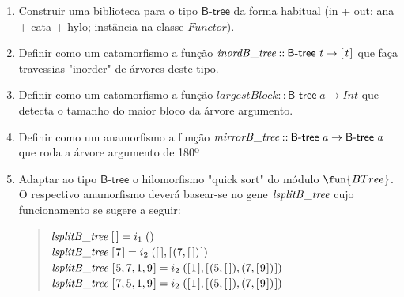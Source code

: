 \documentclass[a4paper]{article}
\newcommand{\Conid}[1]{\mathit{#1}}
\newcommand{\Varid}[1]{\mathit{#1}}
\begin{document}
\begin{enumerate}
\item	Construir uma biblioteca para o tipo \ensuremath{\mathsf{B}\mbox{-}\mathsf{tree} } da forma habitual
        (in + out; ana + cata + hylo; instância na classe \ensuremath{\Conid{Functor}}).
\item
	Definir como um catamorfismo a função \ensuremath{\Varid{inordB\char95 tree}\mathbin{::}\mathsf{B}\mbox{-}\mathsf{tree} \;\Varid{t}\to [\mskip1.5mu \Varid{t}\mskip1.5mu]}
        que faça travessias "inorder" de árvores deste tipo.
\item
	Definir como um catamorfismo a função \ensuremath{\Varid{largestBlock}\mathbin{::}\mathsf{B}\mbox{-}\mathsf{tree} \;\Varid{a}\to \Conid{Int}}
        que detecta o tamanho do maior bloco da árvore argumento.
\item
	Definir como um anamorfismo a função \ensuremath{\Varid{mirrorB\char95 tree}\mathbin{::}\mathsf{B}\mbox{-}\mathsf{tree} \;\Varid{a}\to \mathsf{B}\mbox{-}\mathsf{tree} \;\Varid{a}}
        que roda a árvore argumento de 180º
\item
	Adaptar ao tipo \ensuremath{\mathsf{B}\mbox{-}\mathsf{tree} } o hilomorfismo "quick sort" do módulo \ensuremath{\fun{BTree} }.
	O respectivo anamorfismo deverá basear-se no gene \ensuremath{\Varid{lsplitB\char95 tree}}
	cujo funcionamento se sugere a seguir:
\begin{quote}
\ensuremath{\Varid{lsplitB\char95 tree}\;[\mskip1.5mu \mskip1.5mu]\mathrel{=}i_1\;()}
\\
\ensuremath{\Varid{lsplitB\char95 tree}\;[\mskip1.5mu \mathrm{7}\mskip1.5mu]\mathrel{=}i_2\;([\mskip1.5mu \mskip1.5mu],[\mskip1.5mu (\mathrm{7},[\mskip1.5mu \mskip1.5mu])\mskip1.5mu])}
\\
\ensuremath{\Varid{lsplitB\char95 tree}\;[\mskip1.5mu \mathrm{5},\mathrm{7},\mathrm{1},\mathrm{9}\mskip1.5mu]\mathrel{=}i_2\;([\mskip1.5mu \mathrm{1}\mskip1.5mu],[\mskip1.5mu (\mathrm{5},[\mskip1.5mu \mskip1.5mu]),(\mathrm{7},[\mskip1.5mu \mathrm{9}\mskip1.5mu])\mskip1.5mu])}
\\
\ensuremath{\Varid{lsplitB\char95 tree}\;[\mskip1.5mu \mathrm{7},\mathrm{5},\mathrm{1},\mathrm{9}\mskip1.5mu]\mathrel{=}i_2\;([\mskip1.5mu \mathrm{1}\mskip1.5mu],[\mskip1.5mu (\mathrm{5},[\mskip1.5mu \mskip1.5mu]),(\mathrm{7},[\mskip1.5mu \mathrm{9}\mskip1.5mu])\mskip1.5mu])}
\end{quote}


\end{enumerate}
\end{document}
